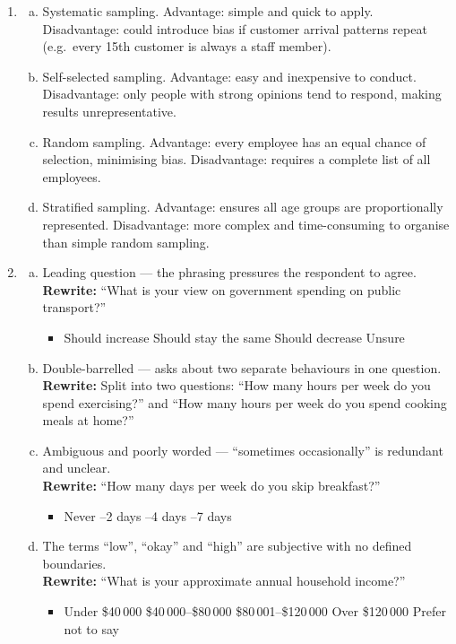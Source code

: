\documentclass{article}
\begin{document}
\begin{enumerate}
  \item
  \begin{enumerate}[(a)]
    \item Systematic sampling. Advantage: simple and quick to apply. Disadvantage: could
    introduce bias if customer arrival patterns repeat (e.g.\ every 15th customer is always
    a staff member).
    \item Self-selected sampling. Advantage: easy and inexpensive to conduct. Disadvantage:
    only people with strong opinions tend to respond, making results unrepresentative.
    \item Random sampling. Advantage: every employee has an equal chance of selection,
    minimising bias. Disadvantage: requires a complete list of all employees.
    \item Stratified sampling. Advantage: ensures all age groups are proportionally
    represented. Disadvantage: more complex and time-consuming to organise than simple
    random sampling.
  \end{enumerate}

  \item
  \begin{enumerate}[(a)]
    \item Leading question --- the phrasing pressures the respondent to agree.\\
    \textbf{Rewrite:} ``What is your view on government spending on public transport?''
    \begin{itemize}
      \item Should increase \quad Should stay the same \quad Should decrease \quad Unsure
    \end{itemize}
    \item Double-barrelled --- asks about two separate behaviours in one question.\\
    \textbf{Rewrite:} Split into two questions: ``How many hours per week do you spend
    exercising?'' and ``How many hours per week do you spend cooking meals at home?''
    \item Ambiguous and poorly worded --- ``sometimes occasionally'' is redundant and
    unclear.\\
    \textbf{Rewrite:} ``How many days per week do you skip breakfast?''
    \begin{itemize}
      \item Never --2 days --4 days --7 days
    \end{itemize}
    \item The terms ``low'', ``okay'' and ``high'' are subjective with no defined boundaries.\\
    \textbf{Rewrite:} ``What is your approximate annual household income?''
    \begin{itemize}
      \item Under \$40\,000 \quad \$40\,000--\$80\,000 \quad \$80\,001--\$120\,000 \quad
      Over \$120\,000 \quad Prefer not to say
    \end{itemize}
  \end{enumerate}


\end{enumerate}
\end{document}
